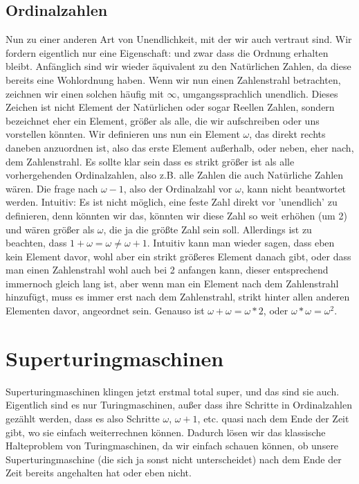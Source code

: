 \documentclass{scrartcl}
\begin{document}
\subsection{Ordinalzahlen}
Nun zu einer anderen Art von Unendlichkeit, mit der wir auch vertraut sind.
Wir fordern eigentlich nur eine Eigenschaft: und zwar dass die Ordnung erhalten
bleibt. Anfänglich sind wir wieder äquivalent zu den Natürlichen Zahlen, da
diese bereits eine Wohlordnung haben. Wenn wir nun einen Zahlenstrahl
betrachten, zeichnen wir einen solchen häufig mit $\infty$, umgangssprachlich
unendlich. Dieses Zeichen ist nicht Element der Natürlichen oder sogar Reellen
Zahlen, sondern bezeichnet eher ein Element, größer als alle, die wir
aufschreiben oder uns vorstellen könnten. Wir definieren uns nun ein Element
$\omega$, das direkt rechts daneben anzuordnen ist, also das erste Element
außerhalb, oder neben, eher nach, dem Zahlenstrahl. Es sollte klar sein dass
es strikt größer ist als alle vorhergehenden Ordinalzahlen, also z.B. alle
Zahlen die auch Natürliche Zahlen wären. Die frage nach $\omega - 1$, also der
Ordinalzahl vor $\omega$, kann nicht beantwortet werden. Intuitiv: Es ist nicht
möglich, eine feste Zahl direkt vor 'unendlich' zu definieren, denn könnten wir
das, könnten wir diese Zahl so weit erhöhen (um 2) und wären größer als
$\omega$, die ja die größte Zahl sein soll. Allerdings ist zu beachten, dass $1
+ \omega = \omega \neq \omega + 1$. Intuitiv kann man wieder sagen, dass eben
kein Element davor, wohl aber ein strikt größeres Element danach gibt, oder
dass man einen Zahlenstrahl wohl auch bei 2 anfangen kann, dieser entsprechend
immernoch gleich lang ist, aber wenn man ein Element nach dem Zahlenstrahl
hinzufügt, muss es immer erst nach dem Zahlenstrahl, strikt hinter allen
anderen Elementen davor, angeordnet sein. Genauso ist $\omega + \omega = \omega
* 2$, oder $\omega * \omega = \omega ^ 2$.


\section{Superturingmaschinen}
Superturingmaschinen klingen jetzt erstmal total super, und das sind sie auch. %
Eigentlich sind es nur Turingmaschinen, außer dass ihre Schritte in
Ordinalzahlen gezählt werden, dass es also Schritte $\omega$, $\omega + 1$,
etc. quasi nach dem Ende der Zeit gibt, wo sie einfach weiterrechnen können.
Dadurch lösen wir das klassische Halteproblem von Turingmaschinen, da wir
einfach schauen können, ob unsere Superturingmaschine (die sich ja sonst nicht
unterscheidet) nach dem Ende der Zeit bereits angehalten hat oder eben nicht.
\end{document}
